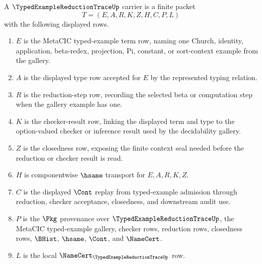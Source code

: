 \begin{definition}
\label{def:typed-example-reduction-trace-carrier}
A $\TypedExampleReductionTraceUp$ carrier is a finite packet
$$
T=(E,A,R,K,Z,H,C,P,L)
$$
with the following displayed rows.
\begin{enumerate}
\item $E$ is the MetaCIC typed-example term row, naming one Church, identity, application, beta-redex, projection, Pi, constant, or sort-context example from the gallery.
\item $A$ is the displayed type row accepted for $E$ by the represented typing relation.
\item $R$ is the reduction-step row, recording the selected beta or computation step when the gallery example has one.
\item $K$ is the checker-result row, linking the displayed term and type to the option-valued checker or inference result used by the decidability gallery.
\item $Z$ is the closedness row, exposing the finite context seal needed before the reduction or checker result is read.
\item $H$ is componentwise $\hsame$ transport for $E,A,R,K,Z$.
\item $C$ is the displayed $\Cont$ replay from typed-example admission through reduction, checker acceptance, closedness, and downstream audit use.
\item $P$ is the $\Pkg$ provenance over $\TypedExampleReductionTraceUp$, the MetaCIC typed-example gallery, checker rows, reduction rows, closedness rows, $\BHist$, $\hsame$, $\Cont$, and $\NameCert$.
\item $L$ is the local $\NameCert_{\TypedExampleReductionTraceUp}$ row.
\end{enumerate}
\end{definition}

